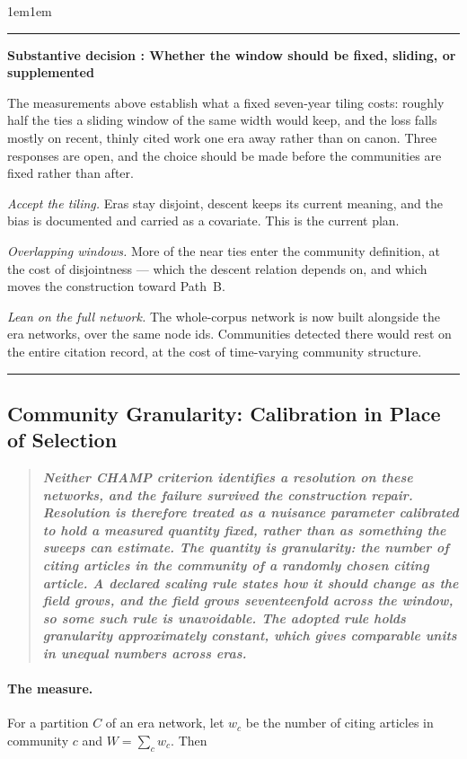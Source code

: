 \documentclass[11pt]{article}
\newcounter{decisioncnt}
\newenvironment{decision}[1]{%
  \refstepcounter{decisioncnt}%
  \par\vspace{0.8em}\noindent
  \begin{adjustwidth}{1em}{1em}%
  \rule{\linewidth}{1.1pt}\par\vspace{0.3em}
  \noindent\textbf{Substantive decision \thedecisioncnt: #1}\par\vspace{0.2em}\small
}{%
  \par\vspace{0.3em}\noindent\rule{\linewidth}{1.1pt}%
  \end{adjustwidth}\vspace{0.8em}
}
\begin{document}
\begin{decision}{Whether the window should be fixed, sliding, or supplemented}
	The measurements above establish what a fixed seven-year tiling costs: roughly half the
	ties a sliding window of the same width would keep, and the loss falls mostly on recent,
	thinly cited work one era away rather than on canon. Three responses are open, and the
	choice should be made before the communities are fixed rather than after.

	\emph{Accept the tiling.} Eras stay disjoint, descent keeps its current meaning, and the
	bias is documented and carried as a covariate. This is the current plan.

	\emph{Overlapping windows.} More of the near ties enter the community definition, at the
	cost of disjointness --- which the descent relation depends on, and which moves the
	construction toward Path~B.

	\emph{Lean on the full network.} The whole-corpus network is now built alongside the era
	networks, over the same node ids. Communities detected there would rest on the entire
	citation record, at the cost of time-varying community structure.
\end{decision}

\subsection{Community Granularity: Calibration in Place of Selection}
\label{sec:granularity}

\begin{quote}
	\textbf{\itshape Neither CHAMP criterion identifies a resolution on these networks, and the
	failure survived the construction repair. Resolution is therefore treated as a nuisance
	parameter calibrated to hold a measured quantity fixed, rather than as something the sweeps
	can estimate. The quantity is granularity: the number of citing articles in the community of
	a randomly chosen citing article. A declared scaling rule states how it should change as the
	field grows, and the field grows seventeenfold across the window, so some such rule is
	unavoidable. The adopted rule holds granularity approximately constant, which gives
	comparable units in unequal numbers across eras.}
\end{quote}

\paragraph{The measure.} For a partition $C$ of an era network, let $w_c$ be the number of
citing articles in community $c$ and $W = \sum_c w_c$. Then
\end{document}
